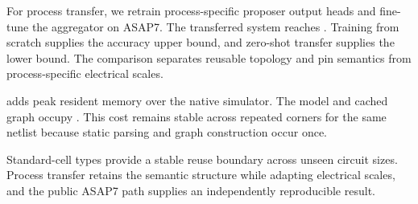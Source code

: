 For process transfer, we retrain process-specific proposer output heads and fine-tune the aggregator on ASAP7. The transferred system reaches \CrossProcessSpeedup{}. Training from scratch supplies the accuracy upper bound, and zero-shot transfer supplies the lower bound. The comparison separates reusable topology and pin semantics from process-specific electrical scales.

\system{} adds \PeakMemoryOverhead{} peak resident memory over the native simulator. The model and cached graph occupy \ModelMemory{}. This cost remains stable across repeated corners for the same netlist because static parsing and graph construction occur once.

\takeaway Standard-cell types provide a stable reuse boundary across unseen circuit sizes. Process transfer retains the semantic structure while adapting electrical scales, and the public ASAP7 path supplies an independently reproducible result.

